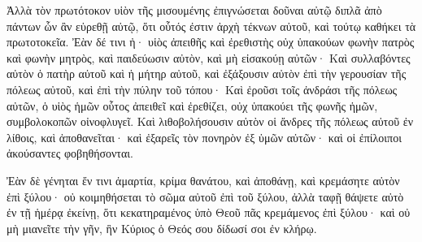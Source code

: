 {Ἀλλὰ τὸν πρωτότοκον υἱὸν τῆς μισουμένης ἐπιγνώσεται δοῦναι αὐτῷ διπλᾶ ἀπὸ πάντων ὧν ἂν εὑρεθῇ αὐτῷ, ὅτι οὗτός ἐστιν ἀρχὴ τέκνων αὐτοῦ, καὶ τούτῳ καθήκει τὰ πρωτοτοκεῖα.
Ἐὰν δέ τινι ἠ· υἱὸς ἀπειθῆς καὶ ἐρεθιστὴς οὐχ ὑπακούων φωνὴν πατρὸς καὶ φωνὴν μητρὸς, καὶ παιδεύωσιν αὐτὸν, καὶ μὴ εἰσακούῃ αὐτῶν·
Καὶ συλλαβόντες αὐτὸν ὁ πατὴρ αὐτοῦ καὶ ἡ μήτηρ αὐτοῦ, καὶ ἐξάξουσιν αὐτὸν ἐπὶ τὴν γερουσίαν τῆς πόλεως αὐτοῦ, καὶ ἐπὶ τὴν πύλην τοῦ τόπου·
Καὶ ἐροῦσι τοῖς ἀνδράσι τῆς πόλεως αὐτῶν, ὁ υἱὸς ἡμῶν οὗτος ἀπειθεῖ καὶ ἐρεθίζει, οὐχ ὑπακούει τῆς φωνῆς ἡμῶν, συμβολοκοπῶν οἰνοφλυγεῖ.
Καὶ λιθοβολήσουσιν αὐτὸν οἱ ἄνδρες τῆς πόλεως αὐτοῦ ἐν λίθοις, καὶ ἀποθανεῖται· καὶ ἐξαρεῖς τὸν πονηρὸν ἐξ ὑμῶν αὐτῶν· καὶ οἱ ἐπίλοιποι ἀκούσαντες φοβηθήσονται.
\par }{\PP {}Ἐὰν δὲ γένηται ἔν τινι ἁμαρτία, κρίμα θανάτου, καὶ ἀποθάνῃ, καὶ κρεμάσητε αὐτὸν ἐπὶ ξύλου·
οὐ κοιμηθήσεται τὸ σῶμα αὐτοῦ ἐπὶ τοῦ ξύλου, ἀλλὰ ταφῇ θάψετε αὐτὸ ἐν τῇ ἡμέρᾳ ἐκείνῃ, ὅτι κεκατηραμένος ὑπὸ Θεοῦ πᾶς κρεμάμενος ἐπὶ ξύλου· καὶ οὐ μὴ μιανεῖτε τὴν γῆν, ἣν Κύριος ὁ Θεός σου δίδωσί σοι ἐν κλήρῳ.

}
